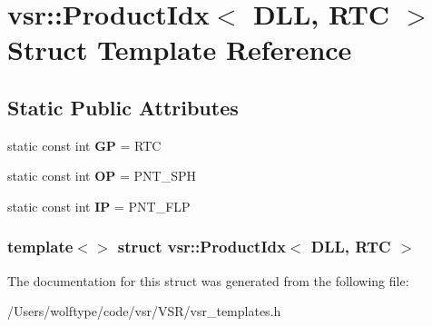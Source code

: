 \hypertarget{structvsr_1_1_product_idx_3_01_d_l_l_00_01_r_t_c_01_4}{\section{vsr\-:\-:Product\-Idx$<$ D\-L\-L, R\-T\-C $>$ Struct Template Reference}
\label{structvsr_1_1_product_idx_3_01_d_l_l_00_01_r_t_c_01_4}
}
\subsection*{Static Public Attributes}
\begin{DoxyCompactItemize}
\item 
\hypertarget{structvsr_1_1_product_idx_3_01_d_l_l_00_01_r_t_c_01_4_a3cb4286b3e7b2a972cd70372daada08e}{static const int {\bfseries G\-P} = R\-T\-C}\label{structvsr_1_1_product_idx_3_01_d_l_l_00_01_r_t_c_01_4_a3cb4286b3e7b2a972cd70372daada08e}

\item 
\hypertarget{structvsr_1_1_product_idx_3_01_d_l_l_00_01_r_t_c_01_4_afcf746042bca499d8b1e769774cb1a83}{static const int {\bfseries O\-P} = P\-N\-T\-\_\-\-S\-P\-H}\label{structvsr_1_1_product_idx_3_01_d_l_l_00_01_r_t_c_01_4_afcf746042bca499d8b1e769774cb1a83}

\item 
\hypertarget{structvsr_1_1_product_idx_3_01_d_l_l_00_01_r_t_c_01_4_afea7345894087d6232f34044fa5bae7d}{static const int {\bfseries I\-P} = P\-N\-T\-\_\-\-F\-L\-P}\label{structvsr_1_1_product_idx_3_01_d_l_l_00_01_r_t_c_01_4_afea7345894087d6232f34044fa5bae7d}

\end{DoxyCompactItemize}
\subsubsection*{template$<$$>$ struct vsr\-::\-Product\-Idx$<$ D\-L\-L, R\-T\-C $>$}



The documentation for this struct was generated from the following file\-:\begin{DoxyCompactItemize}
\item 
/\-Users/wolftype/code/vsr/\-V\-S\-R/vsr\-\_\-templates.\-h\end{DoxyCompactItemize}
